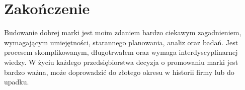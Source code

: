 \documentclass [a4paper, 11pt]{article}
\begin{document}
\section{Zakończenie}
Budowanie dobrej marki jest moim zdaniem bardzo ciekawym zagadnieniem, wymagającym umiejętności, starannego planowania, analiz oraz badań. Jest procesem skomplikowanym, długotrwałem oraz wymaga interdyscyplinarnej wiedzy. W życiu każdego przedsiębiorstwa decyzja o promowaniu marki jest bardzo ważna, może doprowadzić do złotego okresu w historii firmy lub do upadku.
\clearpage


\end{document}
